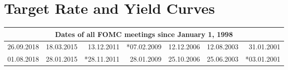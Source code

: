 \documentclass[11pt,a4paper,english,oneside]{book}
\numberwithin{equation}{chapter}
\begin{document}




\newpage

\appendix
\noappendicestocpagenum
\addappheadtotoc



\renewcommand{\theequation}{A.\arabic{equation}}


\chapter{Target Rate and Yield Curves}\label{AppendixA}
\vspace{-0.5cm}

\begin{table}[h] %
	\centering %
	\begin{tabular}{r r r r r r r } %
		\toprule %
		\multicolumn{7}{c}{Dates of all FOMC meetings since January 1, 1998} \\
		\midrule %
						26.09.2018 & 18.03.2015 & 13.12.2011 & *07.02.2009 & 12.12.2006 & 12.08.2003 & 31.01.2001 \\
						01.08.2018 & 28.01.2015 & *28.11.2011 & 28.01.2009 & 25.10.2006 & 25.06.2003 & *03.01.2001 \\

\end{tabular}
\end{table}
\end{document}
